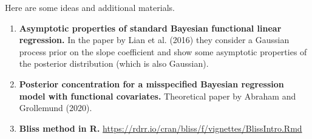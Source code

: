 \documentclass[
  a4paper,
	fontsize=11pt, %
	twoside=false, %
  secnumdepth=2,
	numbers=noenddot, %
]{kaohandt}
\begin{document}
Here are some ideas and additional materials.

\begin{enumerate}

  \item \textbf{Asymptotic properties of standard Bayesian functional linear regression.} In the paper by Lian et al. (2016) they consider a Gaussian process prior on the slope coefficient and show some asymptotic properties of the posterior distribution (which is also Gaussian).

  \item \textbf{Posterior concentration for a misspecified Bayesian regression model with functional covariates.} Theoretical paper by Abraham and Grollemund (2020).

  \item \textbf{Bliss method in R.} \url{https://rdrr.io/cran/bliss/f/vignettes/BlissIntro.Rmd}

\end{enumerate}
\end{document}
